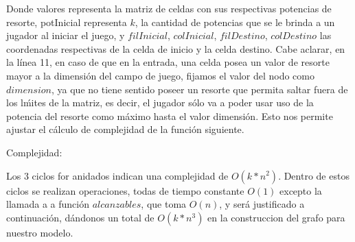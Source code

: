 Donde valores representa la matriz de celdas con sus respectivas potencias de resorte, potInicial representa $k$, la cantidad de potencias que se le brinda a un jugador al iniciar el juego, y $filInicial$, $colInicial$, $filDestino$, $colDestino$ las coordenadas respectivas de la celda de inicio y la celda destino. Cabe aclarar, en la l\'inea 11, en caso de que en la entrada, una celda posea un valor de resorte mayor a la dimensi\'on del campo de juego, fijamos el valor del nodo como $dimension$, ya que no tiene sentido poseer un resorte que permita saltar fuera de los l\'mites de la matriz, es decir, el jugador s\'olo va a poder usar uso de la potencia del resorte como m\'aximo hasta el valor dimensi\'on. Esto nos permite ajustar el c\'alculo de complejidad de la funci\'on siguiente.

\vspace{2mm}

Complejidad:

Los 3 ciclos for anidados indican una complejidad de $O(k*n^2)$. Dentro de estos ciclos se realizan operaciones, todas de tiempo constante $O(1)$ excepto la llamada a a funci\'on $alcanzables$, que toma $O(n)$, y ser\'a justificado a continuaci\'on, d\'andonos un total de $O(k*n^3)$ en la construccion del grafo para nuestro modelo.

